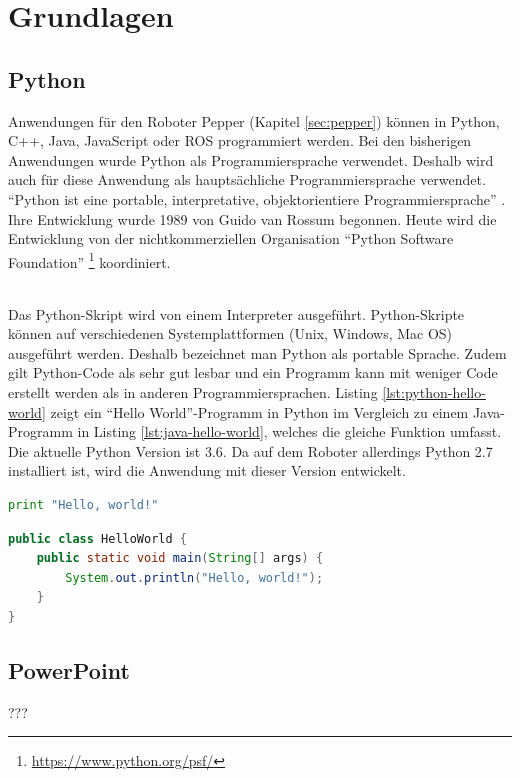 \chapter{Grundlagen}\label{sec:grundlagen}
\section{Python}\label{sec:python}
Anwendungen für den Roboter Pepper (Kapitel \ref{sec:pepper}) können in Python,
C++, Java, JavaScript oder ROS programmiert werden. \cite{SoftBankIII2018} Bei
den bisherigen Anwendungen wurde Python als Programmiersprache verwendet.
Deshalb wird auch für diese Anwendung als
hauptsächliche Programmiersprache verwendet. "`Python ist eine portable,
interpretative, objektorientiere Programmiersprache"' \cite{Weigend2017}. Ihre
Entwicklung wurde 1989 von Guido van Rossum begonnen. Heute wird die Entwicklung
von der nichtkommerziellen Organisation "`Python Software Foundation"'
\footnote{\url{https://www.python.org/psf/}} koordiniert.

\subparagraph{}
Das Python-Skript wird von einem Interpreter ausgeführt. Python-Skripte können
auf verschiedenen Systemplattformen (Unix, Windows, Mac OS) ausgeführt werden.
Deshalb bezeichnet man Python als portable Sprache. Zudem gilt Python-Code als
sehr gut lesbar und ein Programm kann mit weniger Code erstellt
werden als in anderen Programmiersprachen. Listing \ref{lst:python-hello-world}
zeigt ein "`Hello World"'-Programm in Python im Vergleich zu einem Java-Programm
in Listing \ref{lst:java-hello-world}, welches die gleiche Funktion umfasst.
Die aktuelle Python Version ist 3.6.
Da auf dem Roboter allerdings Python 2.7 installiert ist, wird die Anwendung mit
dieser Version entwickelt. \cite{Weigend2017}

\begin{lstlisting}[float, language=Python, frame=single, framexleftmargin=15pt,
style=algoBericht, label={lst:python-hello-world}, captionpos=b, caption={Hello
World in Python}]
print "Hello, world!"
\end{lstlisting}

\begin{lstlisting}[float, language=Java, frame=single, framexleftmargin=15pt,
style=algoBericht, label={lst:java-hello-world}, captionpos=b, caption={Hello
World in Java}]
public class HelloWorld { 
	public static void main(String[] args) {
		System.out.println("Hello, world!"); 
	}
}
\end{lstlisting}

\section{PowerPoint}\label{sec:powerpoint}
???

